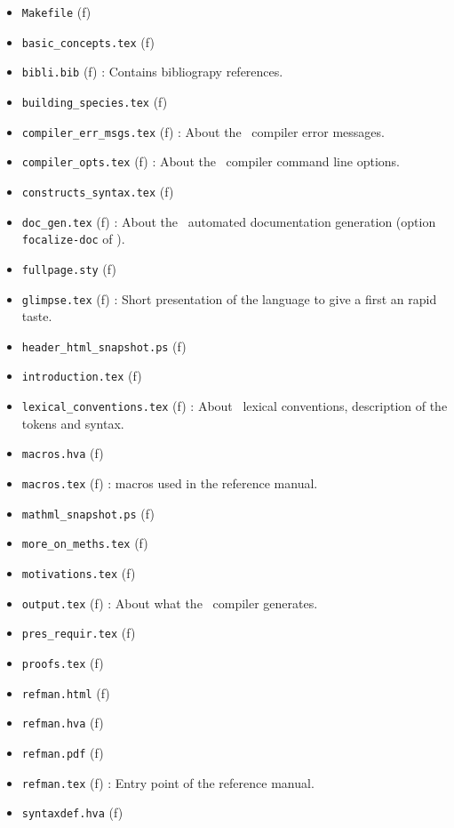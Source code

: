 \begin{itemize}
\begin{itemize}
\begin{itemize}
      \begin{itemize}
      \item {\tt Makefile} (f)
      \item {\tt basic\_concepts.tex} (f)
      \item {\tt bibli.bib} (f) : Contains bibliograpy references.
      \item {\tt building\_species.tex} (f)
      \item {\tt compiler\_err\_msgs.tex} (f) : About the \focalizec\
        compiler error messages.
      \item {\tt compiler\_opts.tex} (f) : About the \focalizec\
        compiler command line options.
      \item {\tt constructs\_syntax.tex} (f)
      \item {\tt doc\_gen.tex} (f) : About the \focalize\ automated
        documentation generation (option {\tt focalize-doc} of
        \focalizec).
      \item {\tt fullpage.sty} (f)
      \item {\tt glimpse.tex} (f) : Short presentation of the language
        to give a first an rapid taste.
      \item {\tt header\_html\_snapshot.ps} (f)
      \item {\tt introduction.tex} (f)
      \item {\tt lexical\_conventions.tex} (f) : About \focalize\ lexical
        conventions, description of the tokens and syntax.
      \item {\tt macros.hva} (f)
      \item {\tt macros.tex} (f) : \latex macros used in the reference
        manual.
      \item {\tt mathml\_snapshot.ps} (f)
      \item {\tt more\_on\_meths.tex} (f)
      \item {\tt motivations.tex} (f)
      \item {\tt output.tex} (f) : About what the \focalizec\ compiler
        generates.
      \item {\tt pres\_requir.tex} (f)
      \item {\tt proofs.tex} (f)
      \item {\tt refman.html} (f)
      \item {\tt refman.hva} (f)
      \item {\tt refman.pdf} (f)
      \item {\tt refman.tex} (f) : Entry point of the reference manual.
      \item {\tt syntaxdef.hva} (f)

\end{itemize}
\end{itemize}
\end{itemize}
\end{itemize}
